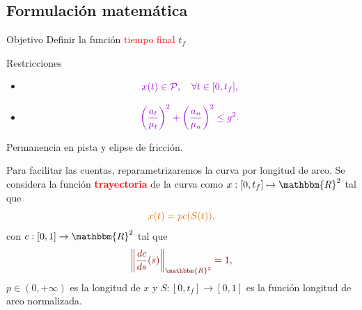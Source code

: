 \documentclass[10pt,mathserif]{beamer}
\newcommand{\R}{\mathbbm{R}}
\newcommand{\arr}{\rightarrow}
\begin{document}
\subsection{Formulación matemática}
\begin{frame}


\begin{block}{Objetivo}
Definir la función \textcolor{red}{tiempo final} $t_f$
\end{block}

\begin{block}{Restricciones}
\begin{itemize}
    \item \[
\textcolor{mymauve}{x(t)\in \mathcal{P}, \quad\forall t\in[0,t_f],}
\]
\item \begin{equation*}
 \textcolor{mymauve}{\left(\frac{a_t}{\mu_t}\right)^2+ \left(\frac{a_n}{\mu_n}\right)^2\leq g^2.} 
\end{equation*}
\end{itemize}
\end{block}

\begin{block}{}
\textcolor{mygreen}{Permanencia en pista y elipse de fricción.}
\end{block}







\end{frame}
\begin{frame}

Para facilitar las cuentas, reparametrizaremos la curva por longitud de arco. Se considera la función \textcolor{red}{\textbf{trayectoria}} de la curva como $x:[0,t_f]\mapsto \R^2$ tal que
\begin{equation*}\label{trayectoria}
\textcolor{myorange}{x(t) = p c(S(t)),}
\end{equation*}
con $c:[0,1]\arr\R^2$ tal que
\begin{equation*}\label{pla}
\textcolor{mybrown}{\left \|\frac{dc}{ds}(s)\right\|_{\R^2}=1,}
\end{equation*}
$p\in(0,+\infty)$ es la longitud de $x$ y $S:[0,t_f]\arr[0,1]$ es la función longitud de arco normalizada.

\end{frame}
\end{document}
